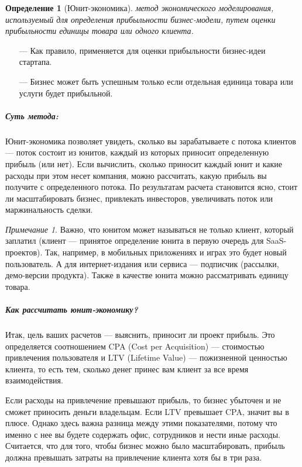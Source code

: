 \documentclass[11pt]{article}
\theoremstyle{plain} %
\newtheorem{proposition}[theorem]{Определение}
\theoremstyle{definition} %
\theoremstyle{remark} %
\newtheorem{nota}{Примечание}
\begin{document}
\begin{proposition}[Юнит-экономика]
	метод экономического моделирования, используемый для определения прибыльности бизнес-модели, путем оценки прибыльности единицы товара или одного клиента.
\end{proposition}

\begin{itemize}
	\item[---] Как правило, применяется для оценки прибыльности бизнес-идеи стартапа.
	\item[---] Бизнес может быть успешным только если отдельная единица товара или услуги будет прибыльной.
\end{itemize}

\subparagraph{Суть метода:}
Юнит-экономика позволяет увидеть, сколько вы зарабатываете с потока клиентов — поток состоит из юнитов, каждый из которых приносит определенную прибыль (или нет). Если вычислить, сколько приносит каждый юнит и какие расходы при этом несет компания, можно рассчитать, какую прибыль вы получите с определенного потока. По результатам расчета становится ясно, стоит ли масштабировать бизнес, привлекать инвесторов, увеличивать поток или маржинальность сделки.

\begin{nota}
	Важно, что юнитом может называться не только клиент, который заплатил (клиент — принятое определение юнита в первую очередь для SaaS-проектов). Так, например, в мобильных приложениях и играх это будет новый пользователь. А для интернет-издания или сервиса — подписчик (рассылки, демо-версии продукта). Также в качестве юнита можно рассматривать единицу товара.
\end{nota}

\subparagraph{Как рассчитать юнит-экономику?}
Итак, цель ваших расчетов — выяснить, приносит ли проект прибыль. Это определяется соотношением CPA (Cost per Acquisition) — стоимостью привлечения пользователя и LTV (Lifetime Value) — пожизненной ценностью клиента, то есть тем, сколько денег принес вам клиент за все время взаимодействия.

Если расходы на привлечение превышают прибыль, то бизнес убыточен и не сможет приносить деньги владельцам. Если LTV превышает CPA, значит вы в плюсе. Однако здесь важна разница между этими показателями, потому что именно с нее вы будете содержать офис, сотрудников и нести иные расходы. Считается, что для того, чтобы бизнес можно было масштабировать, прибыль должна превышать затраты на привлечение клиента хотя бы в три раза.
\end{document}
